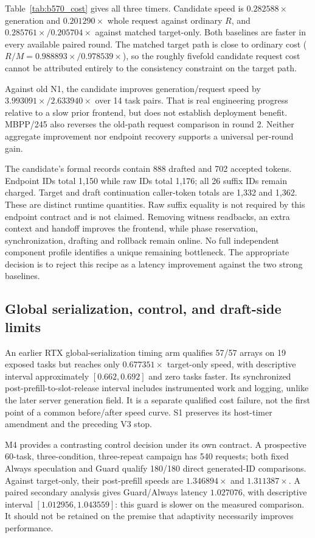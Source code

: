Table~\ref{tab:b570_cost} gives all three timers. Candidate speed is $0.282588\times$ generation and $0.201290\times$ whole request against ordinary $R$, and $0.285761\times/0.205704\times$ against matched target-only. Both baselines are faster in every available paired round. The matched target path is close to ordinary cost ($R/M=0.988893\times/0.978539\times$), so the roughly fivefold candidate request cost cannot be attributed entirely to the consistency constraint on the target path.



Against old N1, the candidate improves generation/request speed by $3.993091\times/2.633940\times$ over 14 task pairs. That is real engineering progress relative to a slow prior frontend, but does not establish deployment benefit. MBPP/245 also reverses the old-path request comparison in round 2. Neither aggregate improvement nor endpoint recovery supports a universal per-round gain.

The candidate's formal records contain 888 drafted and 702 accepted tokens. Endpoint IDs total 1,150 while raw IDs total 1,176; all 26 suffix IDs remain charged. Target and draft continuation caller-token totals are 1,332 and 1,362. These are distinct runtime quantities. Raw suffix equality is not required by this endpoint contract and is not claimed. Removing witness readbacks, an extra context and handoff improves the frontend, while phase reservation, synchronization, drafting and rollback remain online. No full independent component profile identifies a unique remaining bottleneck. The appropriate decision is to reject this recipe as a latency improvement against the two strong baselines.

\subsection{Global serialization, control, and draft-side limits}
An earlier RTX global-serialization timing arm qualifies 57/57 arrays on 19 exposed tasks but reaches only $0.677351\times$ target-only speed, with descriptive interval approximately $[0.662,0.692]$ and zero tasks faster. Its synchronized post-prefill-to-slot-release interval includes instrumented work and logging, unlike the later server generation field. It is a separate qualified cost failure, not the first point of a common before/after speed curve. S1 preserves its host-timer amendment and the preceding V3 stop.

M4 provides a contrasting control decision under its own contract. A prospective 60-task, three-condition, three-repeat campaign has 540 requests; both fixed Always speculation and Guard qualify 180/180 direct generated-ID comparisons. Against target-only, their post-prefill speeds are $1.346894\times$ and $1.311387\times$. A paired secondary analysis gives Guard/Always latency $1.027076$, with descriptive interval $[1.012956,1.043559]$: this guard is slower on the measured comparison. It should not be retained on the premise that adaptivity necessarily improves performance.

